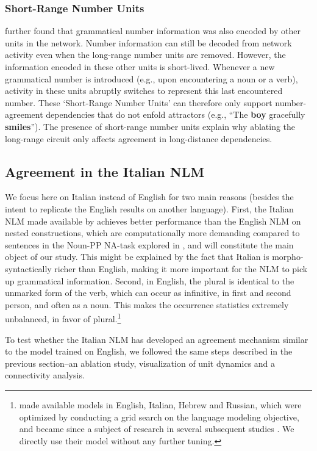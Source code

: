 \subsubsection{Short-Range Number Units}
\citet{lakretz2019emergence} further found that grammatical number information was also encoded
by other units in the network. Number information can still be
decoded from network activity even when the long-range number units
are removed. However, the information encoded in these other units is short-lived. Whenever a new grammatical number  is
introduced (e.g., upon encountering a noun or a verb), activity in
these units abruptly switches to represent this last encountered
number. These `Short-Range Number Units' can therefore only support number-agreement dependencies that do not
enfold attractors (e.g., ``The \textbf{boy} gracefully
\textbf{smiles}''). The presence of short-range number units explain why ablating the long-range circuit only affects agreement in long-distance dependencies.


\subsection{Agreement in the Italian NLM}
We focus here on Italian instead of English for two main reasons (besides the intent to replicate the English results on another language). First, the Italian NLM made available by \citet{Gulordava:etal:2018} achieves better performance than the English NLM on nested constructions, which are computationally more demanding compared to sentences in the Noun-PP NA-task explored in \citet{lakretz2019emergence}, and will constitute the main object of our study. This might be explained by the fact that Italian is morpho-syntactically richer than English, making it more important for the NLM to pick up grammatical information. Second, in English, the plural is identical to the unmarked form of the verb, which can occur as infinitive, in first and second person, and often as a noun. This makes the occurrence statistics extremely unbalanced, in favor of plural.\footnote{\citet{Gulordava:etal:2018} made available models in English, Italian, Hebrew and Russian, which were optimized by conducting a grid search on the language modeling objective, and became since a subject of research in several subsequent studies \citep{Giulianelli:etal:2018, jumelet2019analysing, wilcox2018rnn, futrell2019neural}. We directly use their model without any further tuning.}

To test whether the Italian NLM has developed an agreement mechanism similar to the model trained on English, we followed the same steps described in the previous section--an ablation study, visualization of unit dynamics and a connectivity analysis.

